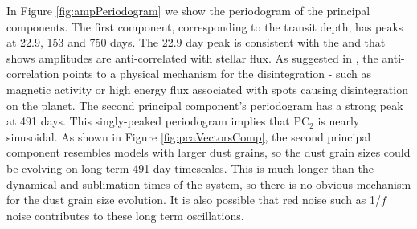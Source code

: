 \documentclass[preprint,trackchanges]{aastex61}
\begin{document}
In Figure \ref{fig:ampPeriodogram} we show the periodogram of the principal components.
The first component, corresponding to the transit depth, has peaks at 22.9, 153 and 750 days.
The 22.9 day peak is consistent with the \citet{kawahara2013starspots} and \citet{croll2015starspots} that shows amplitudes are anti-correlated with stellar flux.
As suggested in \citet{kawahara2013starspots}, the anti-correlation points to a physical mechanism for the disintegration - such as magnetic activity or high energy flux associated with spots causing disintegration on the planet.
The second principal component's periodogram has a strong peak at 491 days.
This singly-peaked periodogram  implies that PC$_2$ is nearly sinusoidal.
As shown in Figure \ref{fig:pcaVectorsComp}, the second principal component resembles models with larger dust grains, so the dust grain sizes could be evolving on long-term 491-day timescales.
This is much longer than the dynamical and sublimation times of the system, so there is no obvious mechanism for the dust grain size evolution.
It is also possible that red noise such as 1/$f$ noise contributes to these long term oscillations.
\end{document}
